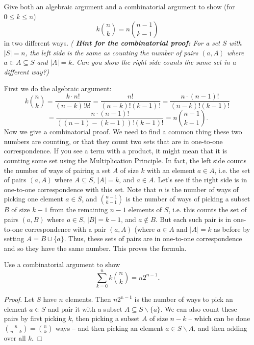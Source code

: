 \documentclass[11pt,dvipsnames]{book}
\numberwithin{figure}{section} %
\numberwithin{table}{section} %
\begin{document}
\begin{exercise}
Give both an algebraic argument and a combinatorial argument to show (for $0 \leq k \leq n$)
\[k\binom{n}{k} = n\binom{n-1}{k-1}\]
in two different ways. {\it( {\bf Hint for the combinatorial proof:}  For a set $S$ with $|S|=n$, the left side is the same as counting the number of pairs $(a,A)$ where $a\in A\subseteq S$ and $|A|=k$. Can you show the right side counts the same set in a different way?)}

\begin{solution}
First we do the algebraic argument:
\[k\binom{n}{k}
=\frac{k\cdot n!}{(n-k)!k!} = \frac{n!}{(n-k)!(k-1)!}  = \frac{n\cdot (n-1)!}{(n-k)!(k-1)!}\]
\[=\frac{n\cdot (n-1)!}{((n-1)-(k-1))!(k-1)!} = n\binom{n-1}{k-1}.
\]
Now we give a combinatorial proof. We need to find a common thing these two numbers are counting, or that they count two sets that are in one-to-one correspondence. If you see a term with a product, it might mean that it is counting some set using the Multiplication Principle. In fact, the left side counts the number of ways of pairing a set $A$ of size $k$ with an element $a\in A$, i.e. the set of pairs $(a,A)$ where $A\subseteq S$, $|A|=k$, and $a\in A$. Let's see if the right side is in one-to-one correspondence with this set. Note that $n$ is the number of ways of picking one element $a\in S$, and $\binom{n-1}{k-1}$ is the number of ways of picking a subset $B$ of size $k-1$ from the remaining $n-1$ elements of $S$, i.e. this counts the set of pairs $(a,B)$ where $a\in S$, $|B|=k-1$, and $a\not\in B$. But each such pair is in one-to-one correspondence with a pair $(a,A)$ (where $a\in A$ and $|A|=k$ as before by setting $A=B\cup \{a\}$. Thus, these sets of pairs are in one-to-one correspondence and so they have the same number. This proves the formula.

\end{solution}
\end{exercise}

\begin{exercise} Use a combinatorial argument to show
\[
\sum_{k=0}^{n} k{n\choose k} =n2^{n-1}.
\]

\begin{solution}
\begin{proof}
Let $S$ have $n$ elements. Then $n2^{n-1}$ is the number of ways to pick an element $a\in S$ and pair it with a subset $A\subseteq S\backslash \{a\}$. We can also count these pairs by first picking $k$, then picking a subset $A$ of size $n-k$ -- which can be done ${n\choose n-k}={n\choose k}$ ways -- and then picking an element $a\in S\backslash A$, and then adding over all $k$.
\end{proof}
\end{solution}
\end{exercise}
\end{document}
